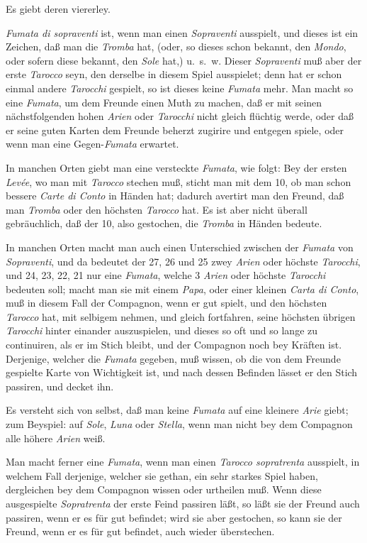 \documentclass[11pt,a6paper,twoside]{article}
\begin{document}
Es giebt deren viererley.

\textit{Fumata di sopraventi} ist, wenn man einen \textit{Sopraventi} ausspielt, und dieses ist ein Zeichen, daß man die \textit{Tromba} hat, (oder, so dieses schon bekannt, den \textit{Mondo}, oder sofern diese bekannt, den \textit{Sole} hat,) u.~s.~w. Dieser \textit{Sopraventi} muß aber der erste \textit{Tarocco} seyn, den derselbe in diesem Spiel ausspielet; denn hat er schon einmal andere \textit{Tarocchi} gespielt, so ist dieses keine \textit{Fumata} mehr. Man macht so eine \textit{Fumata}, um dem Freunde einen Muth zu machen, daß er mit seinen nächstfolgenden hohen \textit{Arien} oder \textit{Tarocchi} nicht gleich flüchtig werde, oder daß er seine guten Karten dem Freunde beherzt zugirire und entgegen spiele, oder wenn man eine Gegen-\textit{Fumata} erwartet.

In manchen Orten giebt man eine versteckte \textit{Fumata}, wie folgt: Bey der ersten \textit{Levée}, wo man mit \textit{Tarocco} stechen muß, sticht man mit dem 10, ob man schon bessere \textit{Carte di Conto} in Händen hat; dadurch avertirt man den Freund, daß man \textit{Tromba} oder den höchsten \textit{Tarocco} hat. Es ist aber nicht überall gebräuchlich, daß der 10, also gestochen, die \textit{Tromba} in Händen bedeute.

In manchen Orten macht man auch einen Unterschied zwischen der \textit{Fumata} von \textit{Sopraventi}, und da bedeutet der 27, 26 und 25 zwey \textit{Arien} oder höchste \textit{Tarocchi}, und 24, 23, 22, 21 nur eine \textit{Fumata}, welche 3 \textit{Arien} oder höchste \textit{Tarocchi} bedeuten soll; macht man sie mit einem \textit{Papa}, oder einer kleinen \textit{Carta di Conto}, muß in diesem Fall der Compagnon, wenn er gut spielt, und den höchsten \textit{Tarocco} hat, mit selbigem nehmen, und gleich fortfahren, seine höchsten übrigen \textit{Tarocchi} hinter einander auszuspielen, und dieses so oft und so lange zu continuiren, als er im Stich bleibt, und der Compagnon noch bey Kräften ist. Derjenige, welcher die \textit{Fumata} gegeben, muß wissen, ob die von dem Freunde gespielte Karte von Wichtigkeit ist, und nach dessen Befinden lässet er den Stich passiren, und decket ihn.

Es versteht sich von selbst, daß man keine \textit{Fumata} auf eine kleinere \textit{Arie} giebt; zum Beyspiel: auf \textit{Sole}, \textit{Luna} oder \textit{Stella}, wenn man nicht bey dem Compagnon alle höhere \textit{Arien} weiß.

Man macht ferner eine \textit{Fumata}, wenn man einen \textit{Tarocco sopratrenta} ausspielt, in welchem Fall derjenige, welcher sie gethan, ein sehr starkes Spiel haben, dergleichen bey dem Compagnon wissen oder urtheilen muß. Wenn diese ausgespielte \textit{Sopratrenta} der erste Feind passiren läßt, so läßt sie der Freund auch passiren, wenn er es für gut befindet; wird sie aber gestochen, so kann sie der Freund, wenn er es für gut befindet, auch wieder überstechen.
\end{document}
